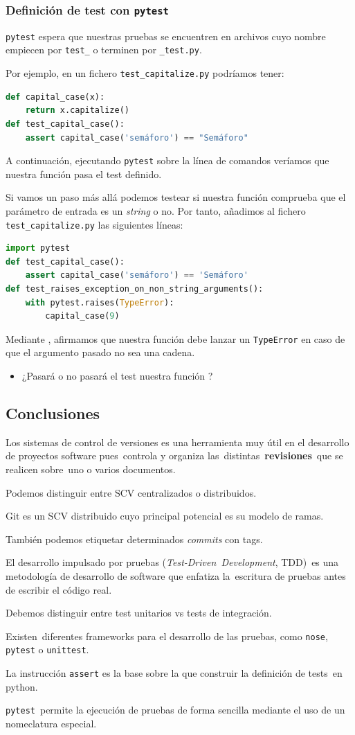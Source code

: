 \subsubsection{Definición de test con \textbf{\texttt{pytest}}}
\texttt{pytest} espera que nuestras pruebas se encuentren en archivos cuyo nombre empiecen por \texttt{test_} o terminen por \texttt{_test.py}.

Por ejemplo, en un fichero \texttt{test_capitalize.py} podríamos tener:
\begin{lstlisting}[language=python]
def capital_case(x):
	return x.capitalize()
def test_capital_case():
	assert capital_case('semáforo') == "Semáforo"
\end{lstlisting}
A continuación, ejecutando \texttt{pytest} sobre la línea de comandos veríamos que nuestra función  pasa el test definido.

Si vamos un paso más allá podemos testear si nuestra función  comprueba que el parámetro de entrada es un \textit{string} o no. Por tanto, añadimos al fichero \texttt{test_capitalize.py} las siguientes líneas:
\begin{lstlisting}[language=python]
import pytest
def test_capital_case(): 
	assert capital_case('semáforo') == 'Semáforo' 
def test_raises_exception_on_non_string_arguments(): 
	with pytest.raises(TypeError): 
		capital_case(9)
\end{lstlisting}
Mediante , afirmamos que nuestra función debe lanzar un \texttt{TypeError} en caso de que el argumento pasado no sea una cadena. 
\begin{itemize}
	\item ¿Pasará o no pasará el test nuestra función ?
\end{itemize}
\subsection{Conclusiones}
Los sistemas de control de versiones es una herramienta muy útil en el desarrollo de proyectos software pues controla y organiza las distintas \textbf{revisiones} que se realicen sobre uno o varios documentos.

Podemos distinguir entre SCV centralizados o distribuidos.

Git es un SCV distribuido cuyo principal potencial es su modelo de ramas.

También podemos etiquetar determinados \textit{commits} con tags.

El desarrollo impulsado por pruebas (\textit{Test-Driven Development}, TDD) es una metodología de desarrollo de software que enfatiza la escritura de pruebas antes de escribir el código real.

Debemos distinguir entre test unitarios vs tests de integración.

Existen diferentes frameworks para el desarrollo de las pruebas, como \texttt{nose}, \texttt{pytest} o \texttt{unittest}.

La instrucción \texttt{assert} es la base sobre la que construir la definición de tests en python.

\texttt{pytest} permite la ejecución de pruebas de forma sencilla mediante el uso de un nomeclatura especial.
